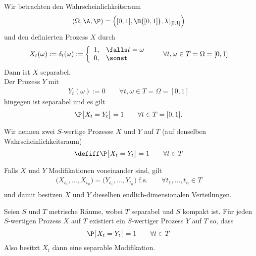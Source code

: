 \begin{aufgabenr}\label{aufg:15}\enter
	Wir betrachten den Wahrscheinlichkeitsraum
	\begin{align*}
		(\Omega,\A,\P)=\Big([0,1],\B\big([0,1]\big),\lambda|_{[0,1]}\Big)
	\end{align*}
	und den definierten Prozess $X$ durch
	\begin{align*}
		X_t(\omega):=\delta_t(\omega):=\left\lbrace\begin{array}{cl}
			1, &\falls t=\omega\\
			0, &\sonst
		\end{array}\right.
		\qquad\forall t,\omega\in T=\Omega=[0,1]
	\end{align*}
	Dann ist $X$  separabel.\\
	Der Prozess $Y$ mit
	\begin{align*}
		Y_t(\omega):=0\qquad\forall t,\omega\in T=\Omega=[0,1]
	\end{align*}
	hingegen ist separabel und es gilt
	\begin{align*}
		\P\big[X_t=Y_t\big]=1\qquad\forall t\in T=[0,1].
	\end{align*}
\end{aufgabenr}

\setcounter{satz}{5}

\begin{definition}\label{def2.1.6}
	Wir nennen zwei $S$-wertige Prozesse $X$ und $Y$ auf $T$ (auf denselben Wahrscheinlichkeitsraum) 
	\begin{align*}
		\defiff \P\big[X_t=Y_t\big]=1\qquad\forall t\in T
	\end{align*}
\end{definition}

\begin{bemerkung} %
	Falls $X$ und $Y$ Modifikationen voneinander sind, gilt
	\begin{align*}
		\Big(X_{t_1},\ldots,X_{t_n}\Big)=\Big(Y_{t_1},\ldots,Y_{t_n}\Big)\text{ f.s.} \qquad\forall t_1,\ldots,t_n\in T\\
	\end{align*}
	und damit besitzen $X$ und $Y$ dieselben endlich-dimensionalen Verteilungen.
\end{bemerkung}

\begin{satz}\label{satz2.1.7}
	Seien $S$ und $T$ metrische Räume, wobei $T$ separabel und $S$ kompakt ist.
	Für jeden $S$-wertigen Prozess $X$ auf $T$ existiert ein  $S$-wertiger Prozess $Y$ auf $T$ so, dass 
	\begin{align*}
		\P\big[X_t=Y_t\big]=1\qquad\forall t\in T
	\end{align*}
	Also besitzt $X_t$ dann eine separable Modifikation.
\end{satz}

